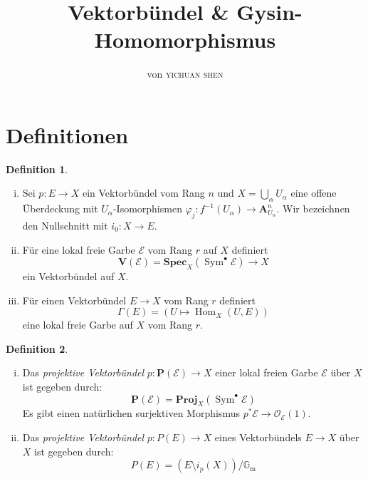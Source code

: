 \documentclass[10pt,a4paper]{article}
\author{von \textsc{yichuan shen}}
\title{Vektorbündel \& Gysin-Homomorphismus}
\begin{document}
\theoremstyle{plain}
\theoremstyle{definition}
\newtheorem{theorem}{Theorem}
\newtheorem{lemma}[theorem]{Lemma}
\newtheorem{proposition}[theorem]{Satz}
\newtheorem{corollary}[theorem]{Korollar}
\theoremstyle{definition}
\newtheorem*{definition}{Definition}
\newtheorem*{example}{Beispiel}
\theoremstyle{remark}
\newtheorem*{remark}{Bemerkung}

\maketitle

\section{Definitionen}

\begin{definition}
\begin{enumerate}[(i)]
\item Sei $p: E\to X$ ein Vektorbündel vom Rang $n$ und $X=\bigcup_\alpha U_\alpha$ eine offene Überdeckung mit $U_\alpha$-Isomorphismen $\varphi_j: f^{-1}(U_\alpha)\to \mathbf{A}_{U_\alpha}^n$. Wir bezeichnen den Nullschnitt mit $i_0: X\to E$.
\item Für eine lokal freie Garbe $\mathcal{E}$ vom Rang $r$ auf $X$ definiert
\[ \mathbf{V}(\mathcal{E}) = \mathbf{Spec}_X(\operatorname{Sym}^\bullet\mathcal{E})\to X \]
ein Vektorbündel auf $X$.
\item Für einen Vektorbündel $E\to X$ vom Rang $r$ definiert
\[ \Gamma(E) = (U\mapsto \operatorname{Hom}_X(U, E)) \]
eine lokal freie Garbe auf $X$ vom Rang $r$.
\end{enumerate}
\end{definition}

\begin{definition}
\begin{enumerate}[(i)]
\item Das \textit{projektive Vektorbündel} $p: \mathbf{P}(\mathcal{E})\to X$ einer lokal freien Garbe $\mathcal{E}$ über $X$ ist gegeben durch:
\[ \mathbf{P}(\mathcal{E}) = \mathbf{Proj}_X(\operatorname{Sym}^\bullet\mathcal{E}) \]
Es gibt einen natürlichen surjektiven Morphismus $p^\ast\mathcal{E}\to \mathcal{O}_\mathcal{E}(1)$.
\item Das \textit{projektive Vektorbündel} $p: P(E)\to X$ eines Vektorbündels $E\to X$ über $X$ ist gegeben durch:
\[ P(E) = (E\setminus i_p(X))/\mathbb{G}_\text{m} \]
\end{enumerate}
\end{definition}
\end{document}
